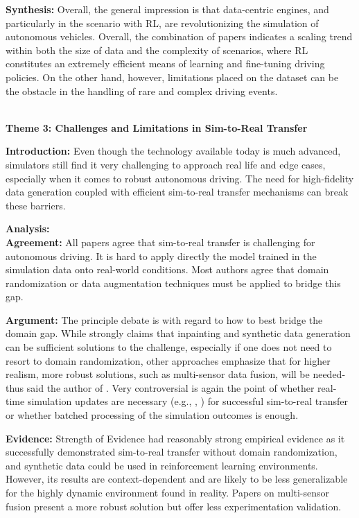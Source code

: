 \documentclass[lettersize,journal]{IEEEtran}
\newcommand{\subsubsubsection}[1]{%
    \par\medskip
    \noindent\textbf{#1}
    \par\medskip
}
\begin{document}
\textbf{Synthesis:}
Overall, the general impression is that data-centric engines, and particularly in the scenario with RL, are revolutionizing the simulation of autonomous vehicles. Overall, the combination of papers indicates a scaling trend within both the size of data and the complexity of scenarios, where RL constitutes an extremely efficient means of learning and fine-tuning driving policies. On the other hand, however, limitations placed on the dataset can be the obstacle in the handling of rare and complex driving events.
\\
\\
\subsubsubsection{Theme 3: Challenges and Limitations in Sim-to-Real Transfer}
\textbf{Introduction:}
Even though the technology available today is much advanced, simulators still find it very challenging to approach real life and edge cases, especially when it comes to robust autonomous driving. The need for high-fidelity data generation coupled with efficient sim-to-real transfer mechanisms can break these barriers.

\textbf{Analysis:} \\
\textbf{Agreement:}
All papers agree that sim-to-real transfer is challenging for autonomous driving. It is hard to apply directly the model trained in the simulation data onto real-world conditions. Most authors agree that domain randomization or data augmentation techniques must be applied to bridge this gap.

\textbf{Argument:}
The principle debate is with regard to how to best bridge the domain gap. While \cite{ref5} strongly claims that inpainting and synthetic data generation can be sufficient solutions to the challenge, especially if one does not need to resort to domain randomization, other approaches emphasize that for higher realism, more robust solutions, such as multi-sensor data fusion, will be needed-thus said the author of \cite{ref2}. Very controversial is again the point of whether real-time simulation updates are necessary (e.g., \cite{ref4}, \cite{ref5}) for successful sim-to-real transfer or whether batched processing of the simulation outcomes is enough.


\textbf{Evidence:}
Strength of Evidence \cite{ref5} had reasonably strong empirical evidence as it successfully demonstrated sim-to-real transfer without domain randomization, and synthetic data could be used in reinforcement learning environments. However, its results are context-dependent and are likely to be less generalizable for the highly dynamic environment found in reality. Papers on multi-sensor fusion present a more robust solution but offer less experimentation validation.
\end{document}
